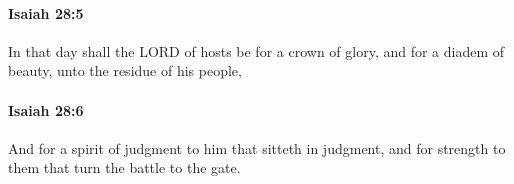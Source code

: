 		\paragraph{Isaiah 28:5} %
			\label{ISAIAH-28-5}

			In that day shall the LORD of hosts be for a crown of glory, and for a diadem of beauty, unto the residue of his people,


		\paragraph{Isaiah 28:6} %
			\label{ISAIAH-28-6}

			And for a spirit of judgment to him that sitteth in judgment, and for strength to them that turn the battle to the gate.



